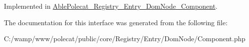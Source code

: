 Implemented in \hyperlink{class_able_polecat___registry___entry___dom_node___component_acc9039051a8b6d4fe7c5ddfbaedbcbcb}{Able\+Polecat\+\_\+\+Registry\+\_\+\+Entry\+\_\+\+Dom\+Node\+\_\+\+Component}.



The documentation for this interface was generated from the following file\+:\begin{DoxyCompactItemize}
\item 
C\+:/wamp/www/polecat/public/core/\+Registry/\+Entry/\+Dom\+Node/Component.\+php\end{DoxyCompactItemize}
